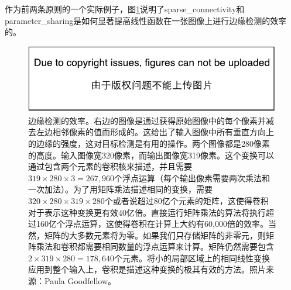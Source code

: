 作为前两条原则的一个实际例子，图\ref{fig:chap9_efficiency_of_edge_detection}说明了\gls{sparse_connectivity}和\gls{parameter_sharing}是如何显著提高线性函数在一张图像上进行边缘检测的效率的。
\begin{figure}
\ifOpenSource
\centerline{\includegraphics{figure.pdf}}
\else
\centering    
{}     
\fi
\captionsetup{singlelinecheck=off}
\caption{边缘检测的效率。右边的图像是通过获得原始图像中的每个像素并减去左边相邻像素的值而形成的。这给出了输入图像中所有垂直方向上的边缘的强度，这对目标检测是有用的操作。两个图像都是280像素的高度。输入图像宽320像素，而输出图像宽319像素。这个变换可以通过包含两个元素的卷积核来描述，并且需要$319\times 280\times 3 = 267,960$个浮点运算（每个输出像素需要两次乘法和一次加法）。为了用矩阵乘法描述相同的变换，需要$320\times 280\times 319\times 280$个或者说超过80亿个元素的矩阵，这使得卷积对于表示这种变换更有效40亿倍。直接运行矩阵乘法的算法将执行超过160亿个浮点运算，这使得卷积在计算上大约有60,000倍的效率。当然，矩阵的大多数元素将为零。如果我们只存储矩阵的非零元，则矩阵乘法和卷积都需要相同数量的浮点运算来计算。矩阵仍然需要包含$2\times 319\times 280=178,640$个元素。将小的局部区域上的相同线性变换应用到整个输入上，卷积是描述这种变换的极其有效的方法。照片来源：Paula Goodfellow。}   
\label{fig:chap9_efficiency_of_edge_detection}     
\end{figure}
 
